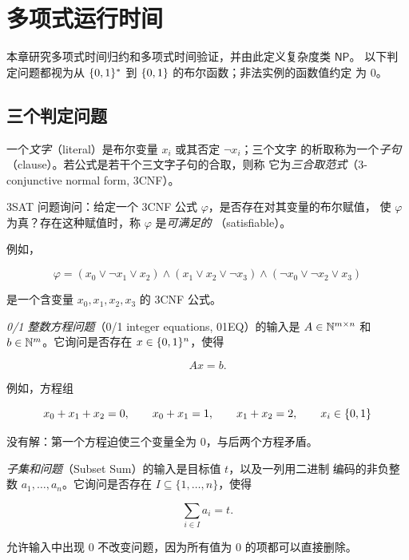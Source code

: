 \chapter{多项式运行时间}
\label{chap:polynomial-running-time}

\lecture
\label{lec:polynomial-running-time}

本章研究多项式时间归约和多项式时间验证，并由此定义复杂度类 $\mathsf{NP}$。
以下判定问题都视为从 $\{0,1\}^{*}$ 到 $\{0,1\}$ 的布尔函数；非法实例的函数值约定
为 $0$。

\section{三个判定问题}

\begin{definition}[3SAT]
  \label{def:3sat}
  一个\emph{文字}（literal）是布尔变量 $x_i$ 或其否定 $\lnot x_i$；三个文字
  的析取称为一个\emph{子句}（clause）。若公式是若干个三文字子句的合取，则称
  它为\emph{三合取范式}（3-conjunctive normal form, 3CNF）。

  3SAT 问题询问：给定一个 3CNF 公式 $\varphi$，是否存在对其变量的布尔赋值，
  使 $\varphi$ 为真？存在这种赋值时，称 $\varphi$ 是\emph{可满足的}
  （satisfiable）。
\end{definition}

例如，

\[
  \varphi=
  (x_0\lor\lnot x_1\lor x_2)
  \land(x_1\lor x_2\lor\lnot x_3)
  \land(\lnot x_0\lor\lnot x_2\lor x_3)
\]

是一个含变量 $x_0,x_1,x_2,x_3$ 的 3CNF 公式。

\begin{definition}[0/1 整数方程]
  \label{def:zero-one-equations}
  \emph{0/1 整数方程问题}（0/1 integer equations, 01EQ）的输入是
  $A\in\mathbb{N}^{m\times n}$ 和 $b\in\mathbb{N}^m$。它询问是否存在
  $x\in\{0,1\}^n$，使得

  \[
    Ax=b.
  \]
\end{definition}

例如，方程组

\[
  x_0+x_1+x_2=0,
  \qquad
  x_0+x_1=1,
  \qquad
  x_1+x_2=2,
  \qquad
  x_i\in\{0,1\}
\]

没有解：第一个方程迫使三个变量全为 $0$，与后两个方程矛盾。

\begin{definition}[子集和]
  \label{def:subset-sum}
  \emph{子集和问题}（Subset Sum）的输入是目标值 $t$，以及一列用二进制
  编码的非负整数 $a_1,\ldots,a_n$。它询问是否存在
  $I\subseteq\{1,\ldots,n\}$，使得

  \[
    \sum_{i\in I}a_i=t.
  \]

  允许输入中出现 $0$ 不改变问题，因为所有值为 $0$ 的项都可以直接删除。
\end{definition}

